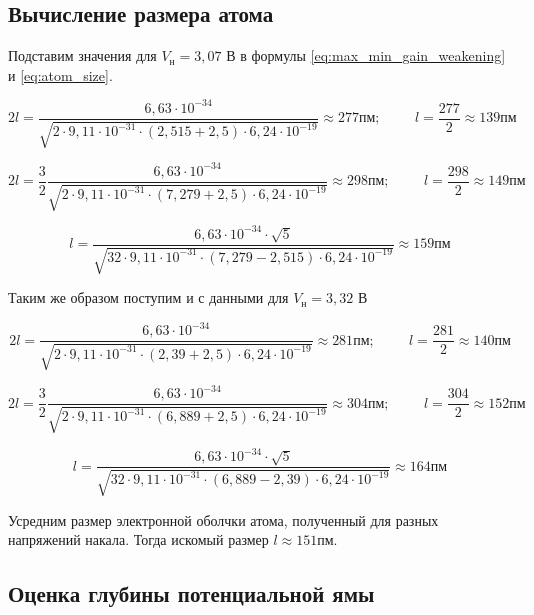 \documentclass[12pt]{article}
\begin{document}
    \subsection{Вычисление размера атома}

      Подставим значения для $V_н = 3,07$ В в формулы
      \ref{eq:max_min_gain_weakening} и \ref{eq:atom_size}.

      $$
        2 l = \frac{6,63 \cdot 10^{-34}}{\sqrt{2 \cdot 9,11 \cdot 10^{-31} \cdot
        \left( 2,515 + 2,5 \right) \cdot 6,24 \cdot 10^{-19}}} \approx 277 пм;
        \hspace{1cm} l = \frac{277}{2} \approx 139 пм
      $$

      $$
        2 l = \frac{3}{2} \frac{6,63 \cdot 10^{-34}}{\sqrt{2 \cdot 9,11 \cdot
        10^{-31} \cdot \left( 7,279 + 2,5 \right) \cdot 6,24 \cdot 10^{-19}}}
        \approx 298 пм; \hspace{1cm} l = \frac{298}{2} \approx 149 пм
      $$

      $$
        l = \frac{6,63 \cdot 10^{-34} \cdot \sqrt{5}}{\sqrt{32 \cdot 9,11 \cdot
        10^{-31} \cdot \left( 7,279 - 2,515 \right) \cdot 6,24 \cdot 10^{-19}}}
        \approx 159 пм
      $$

      Таким же образом поступим и с данными для $V_н = 3,32$ В

      $$
        2 l = \frac{6,63 \cdot 10^{-34}}{\sqrt{2 \cdot 9,11 \cdot 10^{-31} \cdot
        \left( 2,39 + 2,5 \right) \cdot 6,24 \cdot 10^{-19}}} \approx 281 пм;
        \hspace{1cm} l = \frac{281}{2} \approx 140 пм
      $$

      $$
        2 l = \frac{3}{2} \frac{6,63 \cdot 10^{-34}}{\sqrt{2 \cdot 9,11 \cdot
        10^{-31} \cdot \left( 6,889 + 2,5 \right) \cdot 6,24 \cdot 10^{-19}}}
        \approx 304 пм; \hspace{1cm} l = \frac{304}{2} \approx 152 пм
      $$

      $$
        l = \frac{6,63 \cdot 10^{-34} \cdot \sqrt{5}}{\sqrt{32 \cdot 9,11 \cdot
        10^{-31} \cdot \left( 6,889 - 2,39 \right) \cdot 6,24 \cdot 10^{-19}}}
        \approx 164 пм
      $$

      Усредним размер электронной оболчки атома, полученный для разных
      напряжений накала. Тогда искомый размер $l \approx 151 пм$.

    \subsection{Оценка глубины потенциальной ямы}
\end{document}
